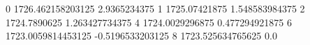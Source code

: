 0 1726.462158203125 2.9365234375
1 1725.07421875 1.548583984375
2 1724.7890625 1.263427734375
4 1724.0029296875 0.477294921875
6 1723.0059814453125 -0.5196533203125
8 1723.525634765625 0.0
